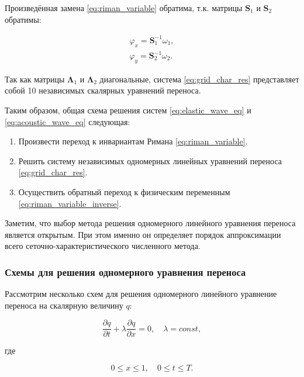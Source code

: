\noindent Произведённая замена \eqref{eq:riman_variable} обратима, т.к. матрицы $\pmb{S}_1$ и $\pmb{S}_2$ обратимы:

\begin{equation}
\begin{matrix}
    \varphi_x  = \pmb{S}_1^{-1} \omega_1  , \\
    \varphi_y  = \pmb{S}_2^{-1} \omega_2  .
\end{matrix}
\label{eq:riman_variable_inverse}
\end{equation}

Так как матрицы $\pmb{\Lambda}_1$ и $\pmb{\Lambda}_2$ диагональные, система \eqref{eq:grid_char_res} представляет собой 10 независимых скалярных уравнений переноса.

Таким образом, общая схема решения систем \eqref{eq:elastic_wave_eq} и \eqref{eq:acoustic_wave_eq} следующая:

\begin{enumerate}
    \item Произвести переход к инвариантам Римана \eqref{eq:riman_variable}.
    \item Решить систему независимых одномерных линейных уравнений переноса \eqref{eq:grid_char_res}.
    \item Осуществить обратный переход к физическим переменным \eqref{eq:riman_variable_inverse}.
\end{enumerate}

Заметим, что выбор метода решения одномерного линейного уравнения переноса является открытым. При этом именно он определяет порядок аппроксимации всего сеточно-характе\-ристического численного метода. 

\subsubsection{Схемы для решения одномерного уравнения переноса}

Рассмотрим несколько схем для решения одномерного линейного  уравнение переноса на скалярную величину $q$:

\begin{equation}
    \dfrac{\partial q}{\partial t} + \lambda \dfrac{\partial q}{\partial x} = 0 , \quad \lambda =const ,
\label{eq:lin_advection}
\end{equation}

\noindent где 

\begin{equation*}
    0 \leq x \leq1, \quad 0 \leq t \leq T .
\end{equation*}

